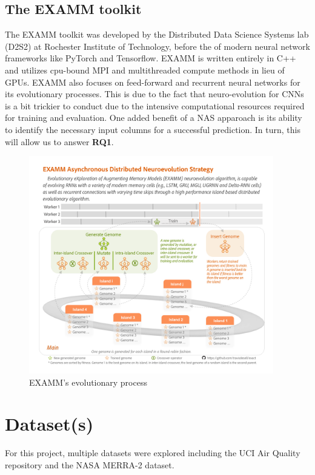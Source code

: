 \documentclass[12pt]{article}
\begin{document}
\subsection{The EXAMM toolkit}
The EXAMM toolkit was developed by the Distributed Data Science Systems lab (D2S2) at Rochester Institute of Technology, before the  of modern neural network frameworks like PyTorch and Tensorflow. EXAMM is written entirely in C++ and utilizes cpu-bound MPI and multithreaded compute methods in lieu of GPUs. EXAMM also focuses on feed-forward and recurrent neural networks for its evolutionary processes. This is due to the fact that neuro-evolution for CNNs is a bit trickier to conduct due to the intensive computational resources required for training and evaluation. One added benefit of a NAS apparoach is its ability to identify the necessary input columns for a successful prediction. In turn, this will allow us to answer \textbf{RQ1}.

\begin{figure}
    \begin{center}
        \includegraphics[width=0.95\textwidth]{resources/EXAMM.png}
    \end{center}
    \caption{EXAMM's evolutionary process \cite{lyu2023online}}\label{fig:examm}
\end{figure}


\section{Dataset(s)}
For this project, multiple datasets were explored including the UCI Air Quality repository and the NASA MERRA-2 dataset.
\end{document}
